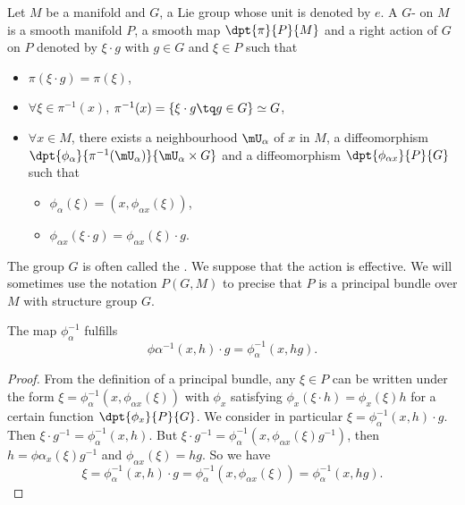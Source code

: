 Let $M$ be a manifold and $G$, a Lie group whose unit is denoted by $e$. A $G$- on $M$ is a smooth manifold $P$, a smooth map $\dpt{\pi}{P}{M}$ and a right action of $G$ on $P$ denoted by $\xi\cdot g$ with $g\in G$ and $\xi\in P$ such that

\begin{itemize}
	\item $\pi(\xi\cdot g)=\pi(\xi)$,
	\item $\forall \xi\in\pi^{-1}(x)$, $\pi^{-1}(x)=\{\xi\cdot g\tq g\in G\}\simeq G$,
	\item $\forall x\in M$, there exists a neighbourhood $\mU_{\alpha}$ of $x$ in $M$, a diffeomorphism $\dpt{\phi_{\alpha}}{\pi^{-1}(\mU_{\alpha})}{\mU_{\alpha}\times G}$ and a diffeomorphism $\dpt{\phi_{\alpha x}}{P}{G}$ such that

	      \begin{itemize}
		      \item $\phi_{\alpha}(\xi)=(x,\phi_{\alpha x}(\xi))$,
		      \item $\phi_{\alpha x}(\xi\cdot g)=\phi_{\alpha x}(\xi)\cdot g$.
	      \end{itemize}
\end{itemize}
The group $G$ is often called the . We suppose that the action is effective. We will sometimes use the notation $P(G,M)$ to precise that $P$ is a principal bundle over $M$ with structure group $G$.

\begin{lemma}\label{lem:phixh}
	The map $\phi_{\alpha}^{-1}$ fulfills
	\[
		\phi\alpha^{-1}(x,h)\cdot g=\phi_{\alpha}^{-1}(x,hg).
	\]
\end{lemma}

\begin{proof}

	From the definition of a principal bundle, any $\xi\in P$ can be written under the form $\xi=\phi_{\alpha}^{-1}(x,\phi_{\alpha x}(\xi))$ with $\phi_x$ satisfying $\phi_x(\xi\cdot h)=\phi_x(\xi)h$ for a certain function $\dpt{\phi_x}{P}{G}$.  We consider in particular $\xi=\phi_{\alpha}^{-1}(x,h)\cdot g$. Then $\xi\cdot g^{-1}=\phi_{\alpha}^{-1}(x,h)$. But $\xi\cdot g^{-1}=\phi_{\alpha}^{-1}(x,\phi_{\alpha x}(\xi)g^{-1})$, then $h=\phi{\alpha_x}(\xi)g^{-1}$ and $\phi_{\alpha x}(\xi)=hg$. So we have
	\[
		\xi=\phi_{\alpha}^{-1}(x,h)\cdot g=\phi_{\alpha}^{-1}(x,\phi_{\alpha x}(\xi))=\phi_{\alpha}^{-1}(x,hg).
	\]

\end{proof}


